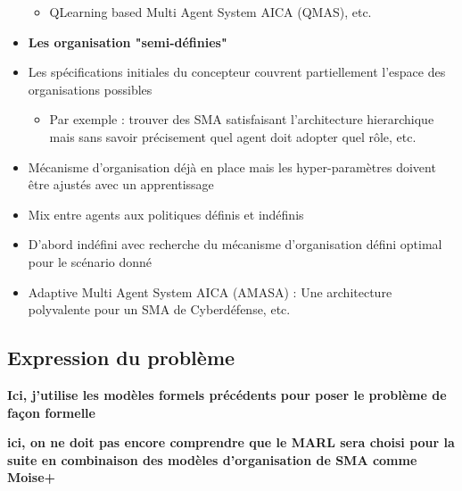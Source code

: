 \documentclass[runningheads]{llncs}
\begin{document}
\begin{itemize}
\begin{itemize}
              \item QLearning based Multi Agent System AICA (QMAS), etc.
          \end{itemize}
    \item \textbf{Les organisation "semi-définies"}
    \item Les spécifications initiales du concepteur couvrent partiellement l'espace des organisations possibles
          \begin{itemize}
              \item Par exemple : trouver des SMA satisfaisant l'architecture hierarchique mais sans savoir précisement quel agent doit adopter quel rôle, etc.
          \end{itemize}
    \item Mécanisme d’organisation déjà en place mais les hyper-paramètres doivent être ajustés avec un apprentissage
    \item Mix entre agents aux politiques définis et indéfinis
    \item D’abord indéfini avec recherche du mécanisme d’organisation défini optimal pour le scénario donné
    \item Adaptive Multi Agent System AICA (AMASA) : Une architecture polyvalente pour un SMA de Cyberdéfense, etc.
\end{itemize}

\subsection{Expression du problème}
\textbf{Ici, j'utilise les modèles formels précédents pour poser le problème de façon formelle}

\textbf{ici, on ne doit pas encore comprendre que le MARL sera choisi pour la suite en combinaison des modèles d'organisation de SMA comme Moise+}
\end{document}
